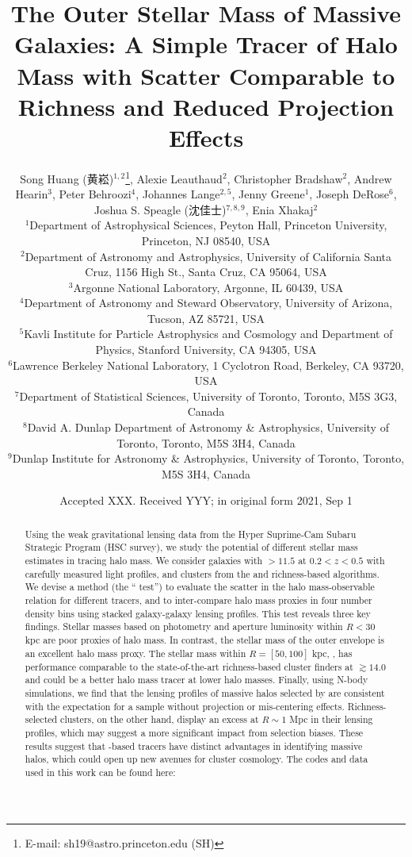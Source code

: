 \documentclass[fleqn,usenatbib,useAMS]{mnras}
\title[Outer Galaxy Mass as a Halo Mass Proxy]{
    The Outer Stellar Mass of Massive Galaxies: A Simple Tracer of Halo Mass with Scatter 
    Comparable to Richness and Reduced Projection Effects}
\author[S. Huang et al.]{
        Song Huang (黄崧)\href{https://orcid.org/0000-0003-1385-7591}{\textcolor{orcidlogocol}{\aiOrcid}}$^{1,2}$\thanks{E-mail: sh19@astro.princeton.edu (SH)},
        Alexie Leauthaud\href{https://orcid.org/0000-0002-3677-3617}{\textcolor{orcidlogocol}{\aiOrcid}}$^{2}$,
        Christopher Bradshaw\href{https://orcid.org/0000-0003-0833-573X}{\textcolor{orcidlogocol}{\aiOrcid}}$^{2}$,
        \newauthor
        Andrew Hearin\href{https://orcid.org/0000-0003-2219-6852}{\textcolor{orcidlogocol}{\aiOrcid}}$^{3}$,
        Peter Behroozi\href{https://orcid.org/0000-0002-2517-6446}{\textcolor{orcidlogocol}{\aiOrcid}}$^{4}$,
        Johannes Lange\href{https://orcid.org/0000-0002-2450-1366}{\textcolor{orcidlogocol}{\aiOrcid}}$^{2, 5}$,
        Jenny Greene\href{https://orcid.org/0000-0002-5612-3427}{\textcolor{orcidlogocol}{\aiOrcid}}$^{1}$,
        \newauthor
        Joseph DeRose\href{https://orcid.org/0000-0002-0728-0960}{\textcolor{orcidlogocol}{\aiOrcid}}$^{6}$,
        Joshua S. Speagle (沈佳士)\href{https://orcid.org/0000-0002-5065-9896}{\textcolor{orcidlogocol}{\aiOrcid}}$^{7, 8, 9}$,
        Enia Xhakaj$^{2}$\\
        $^{1}$Department of Astrophysical Sciences, Peyton Hall,
              Princeton University, Princeton, NJ 08540, USA \\
        $^{2}$Department of Astronomy and Astrophysics, University of California
              Santa Cruz, 1156 High St., Santa Cruz, CA 95064, USA\\
        $^{3}$Argonne National Laboratory, Argonne, IL 60439, USA\\
        $^{4}$Department of Astronomy and Steward Observatory, University of Arizona,
              Tucson, AZ 85721, USA\\
        $^{5}$Kavli Institute for Particle Astrophysics and Cosmology and Department of Physics, 
            Stanford University, CA 94305, USA\\
        $^{6}$Lawrence Berkeley National Laboratory, 1 Cyclotron Road, Berkeley, CA 93720, USA\\
        $^{7}$Department of Statistical Sciences, University of Toronto, Toronto, M5S 3G3, Canada\\
        $^{8}$David A. Dunlap Department of Astronomy \& Astrophysics, University of Toronto, 
            Toronto, M5S 3H4, Canada\\
        $^{9}$Dunlap Institute for Astronomy \& Astrophysics, University of Toronto, 
            Toronto, M5S 3H4, Canada
        }
\date{Accepted XXX. Received YYY; in original form 2021, Sep 1}
\begin{document}
\label{firstpage}
\pagerange{\pageref{firstpage}--\pageref{lastpage}}

\maketitle


\begin{abstract}
    
    Using the weak gravitational lensing data from the Hyper Suprime-Cam Subaru Strategic Program 
    (HSC survey), we study the potential of different stellar mass estimates in tracing halo mass.
    We consider galaxies with \logms{}$>11.5$ at $0.2 < z < 0.5$ with carefully measured light 
    profiles, and clusters from the \redm{} and \camira{} richness-based algorithms.
    We devise a method (the ``\topn{} test'') to evaluate the scatter in the halo mass-observable
    relation for different tracers, and to inter-compare halo mass proxies in four number density 
    bins using stacked galaxy-galaxy lensing profiles.
    This test reveals three key findings. 
    Stellar masses based on \cmodel{} photometry and aperture luminosity within $R<$30 kpc are 
    poor proxies of halo mass. 
    In contrast, the stellar mass of the outer envelope is an excellent halo mass proxy. 
    The stellar mass within $R=[50,100]$ kpc, , has performance comparable to the
    state-of-the-art richness-based cluster finders at \logmvir{}$\gtrsim 14.0$ and could be a
    better halo mass tracer at lower halo masses. 
    Finally, using N-body simulations, we find that the lensing profiles of massive halos selected
    by  are consistent with the expectation for a sample without projection or
    mis-centering effects. 
    Richness-selected clusters, on the other hand, display an excess at $R\sim 1$ Mpc in their 
    lensing profiles, which may suggest a more significant impact from selection biases.
    These results suggest that \mstar{}-based tracers have distinct advantages in
    identifying massive halos, which could open up new avenues for cluster cosmology.
    The codes and data used in this work can be found here: 
    \href{https://github.com/dr-guangtou/jianbing}{\faGithub}
    

\end{abstract}
\end{document}

